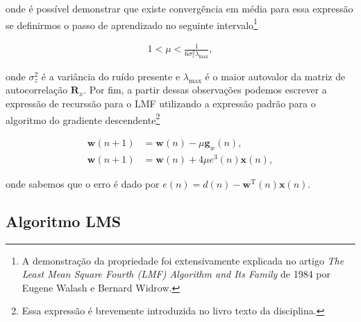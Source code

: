 onde é possível demonstrar que existe convergência em média para essa expressão se definirmos o passo de aprendizado no seguinte intervalo\footnote{A demonstração da propriedade foi extensivamente explicada no artigo \textit{The Least Mean Square Fourth (LMF) Algorithm and Its Family} de 1984 por Eugene Walash e Bernard Widrow.}

\begin{align}
    1 < \mu < \frac{1}{6 \sigma^{2}_{z} \lambda_{\text{max}}},
\end{align}

onde $\sigma^{2}_{z}$ é a variância do ruído presente e $\lambda_{\text{max}}$ é o maior autovalor da matriz de autocorrelação $\mathbf{R}_{x}$. Por fim, a partir dessas observações podemos escrever a expressão de recurssão para o LMF utilizando 
a expressão padrão para o algoritmo do gradiente descendente\footnote{Essa expressão é brevemente introduzida no livro texto da disciplina.}

\begin{align}
    \mathbf{w}(n + 1) &= \mathbf{w}(n) - \mu \mathbf{g}_{w}(n), \\
    \mathbf{w}(n + 1) &= \mathbf{w}(n) + 4 \mu e^{3}(n) \mathbf{x}(n),
\end{align}

onde sabemos que o erro é dado por $e(n) = d(n) - \mathbf{w}^{\text{T}}(n)\mathbf{x}(n)$.
\clearpage


\subsection{Algoritmo LMS} %
    
